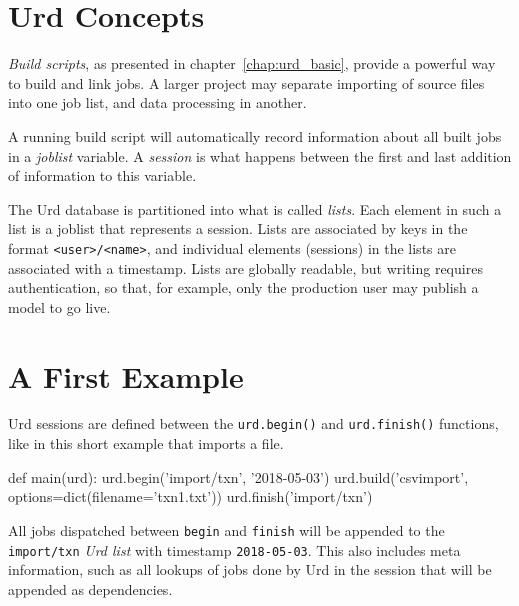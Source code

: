 \section{Urd Concepts}

\textsl{Build scripts}, as presented in chapter~\ref{chap:urd_basic},
provide a powerful way to build and link jobs.  A larger project may
separate importing of source files into one job list, and data
processing in another.

A running build script will automatically record information about all
built jobs in a \textsl{joblist} variable.  A \textsl{session} is what
happens between the first and last addition of information to this
variable.

The Urd database is partitioned into what is called \textsl{lists}.
Each element in such a list is a joblist that represents a session.
Lists are associated by keys in the format \texttt{<user>/<name>}, and
individual elements (sessions) in the lists are associated with a
timestamp.  Lists are globally readable, but writing requires
authentication, so that, for example, only the production user may
publish a model to go live.




\section{A First Example}

Urd sessions are defined between the \texttt{urd.begin()}
and \texttt{urd.finish()} functions, like in this short example that
imports a file.

\begin{python}
def main(urd):
    urd.begin('import/txn', '2018-05-03')
    urd.build('csvimport', options=dict(filename='txn1.txt'))
    urd.finish('import/txn')
\end{python}

All jobs dispatched between \texttt{begin} and \texttt{finish} will be
appended to the \texttt{import/txn} \textsl{Urd list} with
timestamp \texttt{2018-05-03}.  This also includes meta information,
such as all lookups of jobs done by Urd in the session that will be
appended as dependencies.

